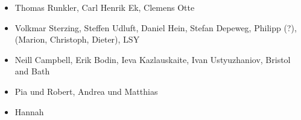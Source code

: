 \begin{Acknowledgements}

    \begin{itemize}
        \item Thomas Runkler, Carl Henrik Ek, Clemens Otte
        \item Volkmar Sterzing, Steffen Udluft, Daniel Hein, Stefan Depeweg, Philipp (?), (Marion, Christoph, Dieter), LSY
        \item Neill Campbell, Erik Bodin, Ieva Kazlauskaite, Ivan Ustyuzhaniov, Bristol and Bath
        \item Pia und Robert, Andrea und Matthias
        \item Hannah
    \end{itemize}
\end{Acknowledgements}

\listoftodos
\todototoc

\tableofcontents

